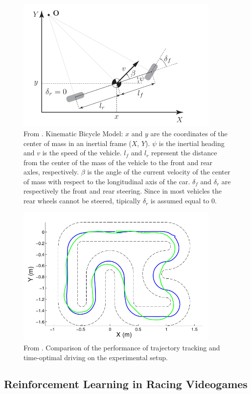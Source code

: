 \begin{figure}
 \centering
  \captionsetup{width=10cm}
  \includegraphics[width=10cm]{./img/bycicle}
  \caption{From \cite{bycicle}. Kinematic Bicycle Model: $x$ and $y$ are the coordinates of the center of mass in an inertial frame ($X$, $Y$). \(\psi\) is the inertial heading and $v$ is the speed of the vehicle. $l_f$ and $l_r$ represent the distance from the center of the mass of the vehicle to the front and rear axles, respectively. $\beta$ is the angle of the current velocity of the center of mass with respect to the longitudinal axis of the car. $\delta_f$ and $\delta_r$ are respectively the front and rear steering. Since in most vehicles the rear wheels cannot be steered, tipically $\delta_r$ is assumed equal to $0$.}
  \label{fig:bycicle}
\end{figure}
\begin{figure}
 \centering
  \captionsetup{width=10cm}
  \includegraphics[width=10cm]{./img/mpc-comparison}
  \caption{From \cite{mpc}. Comparison of the performance of trajectory tracking and time-optimal driving on the experimental setup.}
	 \label{fig:mpc-comparison}
\end{figure}

\subsection{Reinforcement Learning in Racing Videogames}

